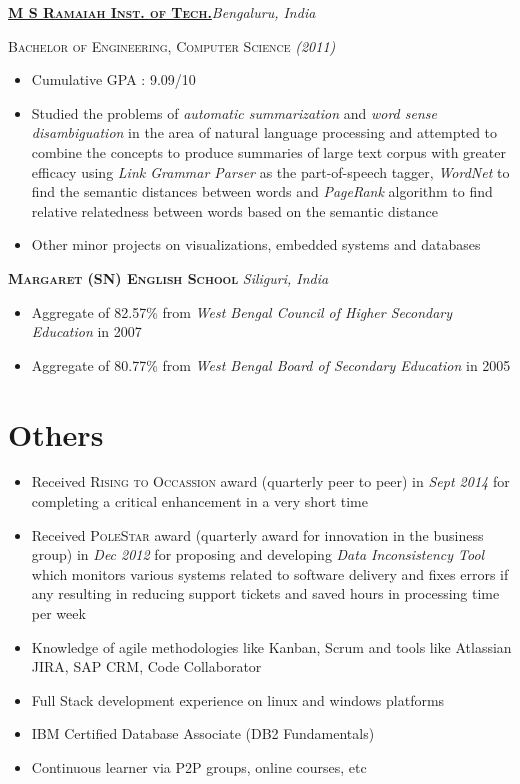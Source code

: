 \documentclass[]{article}
\begin{document}
{\raggedright\textsc{\textbf{\href{http://www.msrit.edu/}{M S Ramaiah Inst. of Tech.}}}\hfill{\raggedleft\textit{Bengaluru, India}}

{\raggedright\textsc{Bachelor of Engineering, Computer Science} \hfill {\raggedleft\textit{(2011)}}

\begin{itemize}[noitemsep,nolistsep]
\item Cumulative GPA : 9.09/10
\item Studied the problems of \textit{automatic summarization} and \textit{word sense disambiguation} in the area of natural language processing and attempted to combine the concepts to produce summaries of large text corpus with greater efficacy using \textit{Link Grammar Parser} as the part-of-speech tagger, \textit{WordNet} to find the semantic distances between words and \textit{PageRank} algorithm to find relative relatedness between words based on the semantic distance
\item Other minor projects on visualizations, embedded systems and databases
\end{itemize}

\vspace*{1\baselineskip}

{\raggedright\textsc{\textbf{Margaret (SN) English School}} \hfill {\raggedleft\textit{Siliguri, India}}

\begin{itemize}[noitemsep,nolistsep]
\item Aggregate of 82.57\% from \textit{West Bengal Council of Higher Secondary Education} in 2007
\item Aggregate of 80.77\% from \textit{West Bengal Board of Secondary Education} in 2005
\end{itemize}

\section{Others}
\begin{itemize}[noitemsep,nolistsep]
\item Received \textsc{Rising to Occassion} award (quarterly peer to peer) in \textit{Sept 2014} for completing a critical enhancement in a very short time
\item Received \textsc{PoleStar} award (quarterly award for innovation in the business group) in \textit{Dec 2012} for proposing and developing \textit{Data Inconsistency Tool} which monitors various systems related to software delivery and fixes errors if any resulting in reducing support tickets and saved hours in processing time per week
\item Knowledge of agile methodologies like Kanban, Scrum and tools like Atlassian JIRA, SAP CRM, Code Collaborator
\item Full Stack development experience on linux and windows platforms
\item IBM Certified Database Associate (DB2 Fundamentals)
\item Continuous learner via P2P groups, online courses, etc
\end{itemize}

}}}
\end{document}
